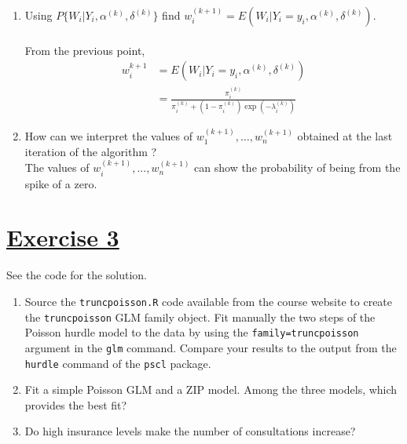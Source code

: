 \documentclass[a4paper,12pt]{article}\usepackage[]{graphicx}\usepackage[]{color}
\begin{document}
\begin{enumerate}
  \item[c)] Using $P\{W_i|Y_i, \alpha^{(k)}, \delta^{(k)}\}$ find
$w_i^{(k+1)}=E(W_i|Y_i=y_i,\alpha^{(k)}, \delta^{(k)})$.\\   \\
\color{blue}
From the previous point,
\begin{align*}
    w_i^{k+1}&=E\left(W_i|Y_i=y_i, \alpha^{(k)},\delta^{(k)}\right)\\[1em]
    &= \frac{\pi_i^{(k)}}{\pi_i^{(k)}+(1-\pi_i^{(k)})\exp(-\lambda_i^{(k)})}
\end{align*}
\color{black}

 \item[d)] How can we interpret the values of $w_1^{(k+1)}, \ldots,
w_n^{(k+1)}$ obtained at the last iteration of the algorithm ?\\  
\color{blue}
The values of $w_i^{(k+1)},...,w_n^{(k+1)}$ can show the probability of being from the spike of a zero.
\color{black}


 \end{enumerate}

\section{\underline{Exercise 3} }

{\color{blue} 
See the code for the solution.}

\begin{enumerate}
\item{Source the \texttt{truncpoisson.R} code available from the course website to create the \texttt{truncpoisson} GLM family object. Fit manually the two steps of the Poisson hurdle model to the data by using the \texttt{family=truncpoisson} argument in the \verb"glm" command. Compare your results to the output from the \texttt{hurdle} command of the \texttt{pscl} package.}
\item{Fit a simple Poisson GLM and a ZIP model. Among the three models, which provides the best fit?} 
\item{Do high insurance levels make the number of consultations increase?}
\end{enumerate}
\end{document}
